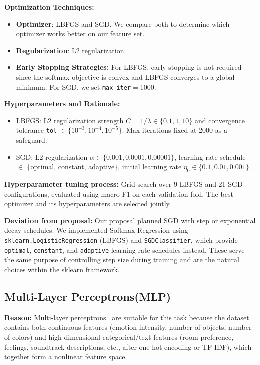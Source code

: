 \documentclass[12pt]{article}
\begin{document}
\textbf{Optimization Techniques:}
    \begin{itemize}
        \item \textbf{Optimizer}: LBFGS and SGD. We compare both to determine which optimizer works better on our feature set.
        \item \textbf{Regularization}: L2 regularization
        \item \textbf{Early Stopping Strategies:} For LBFGS, early stopping is not required since the softmax objective is convex and LBFGS converges to a global minimum. For SGD, we set \texttt{max\_iter}$=$1000.

    \end{itemize}
\textbf{Hyperparameters and Rationale:}
    \begin{itemize}
        \item LBFGS: L2 regularization strength $C = 1/\lambda \in \{0.1, 1, 10\}$ and convergence tolerance \texttt{tol} $\in \{10^{-3}, 10^{-4}, 10^{-5}\}$. Max iterations fixed at 2000 as a safeguard.
        \item SGD: L2 regularization $\alpha \in \{0.001, 0.0001, 0.00001\}$, learning rate schedule $\in$ \{optimal, constant, adaptive\}, initial learning rate $\eta_0 \in \{0.1, 0.01, 0.001\}$.
    \end{itemize}
\textbf{Hyperparameter tuning process:} Grid search over 9 LBFGS and 21 SGD configurations, evaluated using macro-F1 on each validation fold. The best optimizer and its hyperparameters are selected jointly.

\textbf{Deviation from proposal:} Our proposal planned SGD with step or exponential decay schedules. We implemented Softmax Regression using \texttt{sklearn.LogisticRegression} (LBFGS) and \texttt{SGDClassifier}, which provide \texttt{optimal}, \texttt{constant}, and \texttt{adaptive} learning rate schedules instead. These serve the same purpose of controlling step size during training and are the natural choices within the sklearn framework.

\subsection{Multi-Layer Perceptrons(MLP)}

\textbf{Reason:}
Multi-layer perceptrons~\cite{bishop2006prml,hastie2009esl} are suitable for this task because the dataset contains both
continuous features (emotion intensity, number of objects, number of colors) and high-dimensional categorical/text features (room preference, feelings, soundtrack descriptions, etc., after one-hot encoding or TF-IDF),
which together form a nonlinear feature space.
\end{document}
